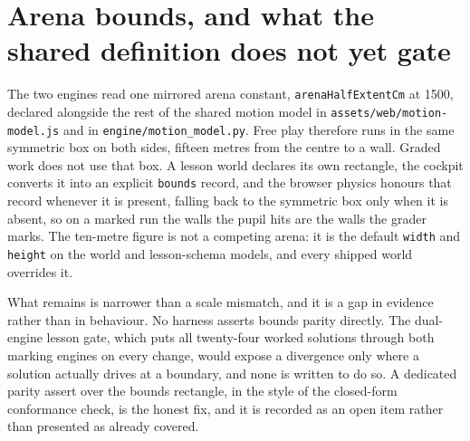 \documentclass[11pt,a4paper]{report}
\begin{document}
\section{Arena bounds, and what the shared definition does not yet gate}
The two engines read one mirrored arena constant, \texttt{arenaHalfExtentCm} at 1500, declared alongside the rest of the shared motion model in \texttt{assets/\allowbreak web/\allowbreak motion-model.js} and in \texttt{engine/\allowbreak motion\_\allowbreak model.py}. Free play therefore runs in the same symmetric box on both sides, fifteen metres from the centre to a wall. Graded work does not use that box. A lesson world declares its own rectangle, the cockpit converts it into an explicit \texttt{bounds} record, and the browser physics honours that record whenever it is present, falling back to the symmetric box only when it is absent, so on a marked run the walls the pupil hits are the walls the grader marks. The ten-metre figure is not a competing arena: it is the default \texttt{width} and \texttt{height} on the world and lesson-schema models, and every shipped world overrides it.

What remains is narrower than a scale mismatch, and it is a gap in evidence rather than in behaviour. No harness asserts bounds parity directly. The dual-engine lesson gate, which puts all twenty-four worked solutions through both marking engines on every change, would expose a divergence only where a solution actually drives at a boundary, and none is written to do so. A dedicated parity assert over the bounds rectangle, in the style of the closed-form conformance check, is the honest fix, and it is recorded as an open item rather than presented as already covered.
\end{document}
